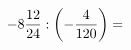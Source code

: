\documentclass[preview]{standalone}
\begin{document}
\begin{align*}
-8 { 12 \over 24 }  :  \left( - { 4 \over 120 } \right)  =
\end{align*}
\end{document}
